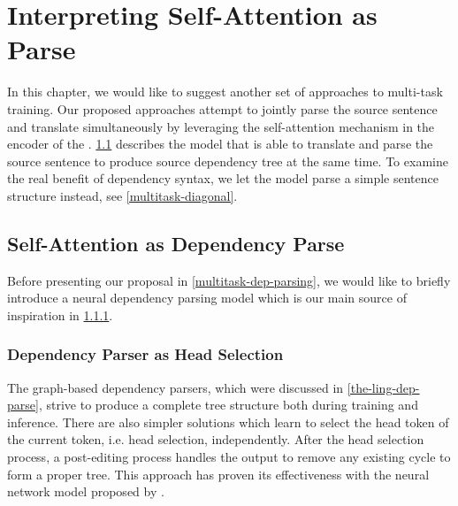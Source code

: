 

\chapter{Interpreting Self-Attention as Parse}
\label{multitask}

In this chapter, we would like to suggest another set of approaches to multi-task training.
Our proposed approaches attempt to jointly parse the source sentence and translate simultaneously by leveraging the self-attention mechanism in the encoder of the \transformer.
\cref{multitask-dep} describes the model that is able to translate and parse the source sentence to produce source dependency tree at the same time.
To examine the real benefit of dependency syntax, we let the model parse a simple sentence structure instead, see \cref{multitask-diagonal}.

\section{Self-Attention as Dependency Parse}
\label{multitask-dep}

Before presenting our proposal in \cref{multitask-dep-parsing}, we would like to briefly introduce a neural dependency parsing model which is our main source of inspiration in \cref{multitask-dep-dozat}.

\subsection{Dependency Parser as Head Selection}
\label{multitask-dep-dozat}

The graph-based dependency parsers, which were discussed in \cref{the-ling-dep-parse}, strive to produce a complete tree structure both during training and inference.
There are also simpler solutions which learn to select the head token of the current token, i.e. head selection, independently.
After the head selection process, a post-editing process handles the output to remove any existing cycle to form a proper tree.
This approach has proven its effectiveness with the neural network model proposed by \cite{dozat:biaffine:2017}.


